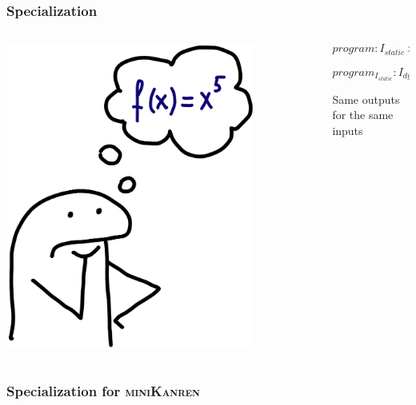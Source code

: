\documentclass[xcolor={dvipsnames}, aspectratio=169]{beamer}
\newcommand{\mk}{\textsc{miniKanren}\xspace}
\begin{document}
\begin{frame}[fragile]
  \frametitle{Specialization}

  \begin{columns}    
    \begin{column}{0.35\textwidth}
      \centering
      \includegraphics[width=0.8\textwidth]{pic/power.jpg}
    \end{column}
    \begin{column}{0.75\textwidth} 
\[
  program: I_{static} \times I_{dynamic} \to O 
\]

\[
  program_{I_{static}}: I_{dynamic} \to O 
\]

\vspace{0.5cm}

\begin{center}
  Same outputs for the same inputs
\end{center}
        \end{column}
        \end{columns}

\end{frame}

\begin{frame}[fragile]
  \frametitle{Specialization for \mk}

\end{frame}
\end{document}
